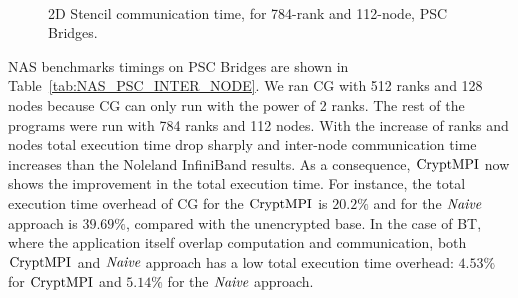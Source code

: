 \begin{figure}[!tbp]
\centering
{}
\,
\captionsetup{singlelinecheck=false}
\caption{2D Stencil communication time, for 784-rank and 112-node, PSC Bridges.}
\label{fig:2d_stencil}
\end{figure}


NAS benchmarks timings on PSC Bridges are shown in Table~\ref{tab:NAS_PSC_INTER_NODE}.
We ran CG with 512 ranks and 128 nodes because CG can only run with the power of 2 ranks.
The rest of the programs were run with 784 ranks and 112 nodes. With the increase of ranks
and nodes total execution time drop sharply and inter-node communication time increases
than the Noleland InfiniBand results. As a consequence, $\textrm{CryptMPI}$ now shows the improvement
in the total execution time. For instance, the total execution time
overhead of CG for the $\textrm{CryptMPI}$ is $20.2\%$ and for the ${\emph{Naive}}$ approach is $39.69\%$,
compared with the unencrypted base. In the case of BT, where the application itself
overlap computation and communication, both $\textrm{CryptMPI}$ and ${\emph{Naive}}$ approach
has a low total execution time overhead: $4.53\%$ for $\textrm{CryptMPI}$ and $5.14\%$ for
the ${\emph{Naive}}$ approach.

